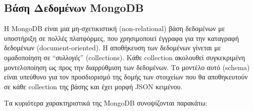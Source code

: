 \clearpage

\subsection{Βάση Δεδομένων MongoDB}

Η MongoDB είναι μια μη-σχετικιστική (non-relational) βάση δεδομένων με υποστήριξη σε πολλές πλατφόρμες, που χρησιμοποιεί έγγραφα για την καταγραφή δεδομένων (document-oriented). Η αποθήκευση των δεδομένων γίνεται με ομαδοποίηση σε ``\textit{συλλογές}'' (collections). Κάθε collection ακολουθεί συγκεκριμένη μοντελοποίηση ως προς την διαρρύθμιση των δεδομένων. Το μοντέλο αυτό (schema) είναι υπεύθυνο για τον προσδιορισμό της δομής των στοιχείων που θα αποθηκευτούν σε κάθε collection της βάσης και έχει μορφή JSON κειμένου. 

Τα κυριότερα χαρακτηριστικά της MongoDB συνοψίζονται παρακάτω:

